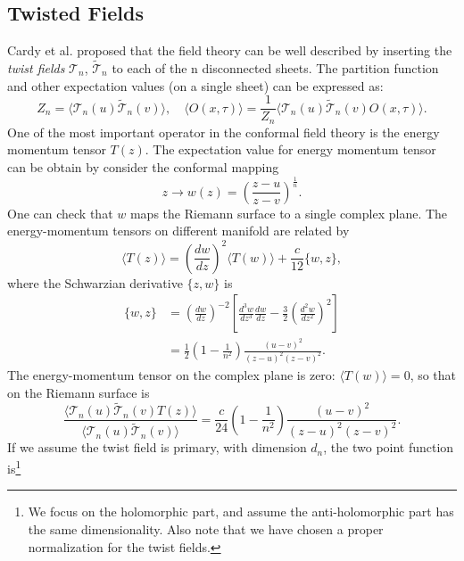 \documentclass[aps,prb,superscriptaddress,nofootinbib]{revtex4}
\begin{document}
\subsection{Twisted Fields}
Cardy et al. proposed that the field theory can be well described by inserting the \textit{twist fields} $\mathcal T_n$, $\tilde{\mathcal T}_n$ to each of the n disconnected sheets.
The partition function and other expectation values (on a single sheet) can be expressed as:
\begin{equation}
	Z_n = \langle \mathcal{T}_n(u) \tilde{\mathcal{T}}_n(v)\rangle, \quad
	\langle O(x,\tau)\rangle = \frac{1}{Z_n}\langle\mathcal{T}_n(u) \tilde{\mathcal{T}}_n(v) O(x,\tau) \rangle.
\end{equation}
One of the most important operator in the conformal field theory is the energy momentum tensor $T(z)$.
The expectation value for energy momentum tensor can be obtain by consider the conformal mapping
\begin{equation}
	z \rightarrow w(z) = \left(\frac{z-u}{z-v}\right)^{\frac{1}{n}}.
\end{equation} 
One can check that $w$ maps the Riemann surface to a single complex plane.
The energy-momentum tensors on different manifold are related by
\begin{equation}
	\langle T(z) \rangle = \left(\frac{d w}{d z}\right)^{2} \langle T(w)\rangle + \frac{c}{12}\{w, z\},
\end{equation}
where the Schwarzian derivative $\{z, w\}$ is
\begin{equation}
\begin{aligned}
	\{w,z\} &= \left(\frac{dw}{dz}\right)^{-2} \left[\frac{d^3 w}{dz^3}\frac{dw}{dz} - \frac{3}{2}\left(\frac{d^2 w}{dz^2}\right)^2\right] \\
	&= \frac{1}{2}\left(1-\frac{1}{n^2}\right)\frac{(u-v)^2}{(z-u)^2(z-v)^2}.
\end{aligned}
\end{equation}
The energy-momentum tensor on the complex plane is zero: $\langle T(w)\rangle=0$, so that on the Riemann surface is
\begin{equation}
	\frac{\langle\mathcal{T}_n(u) \tilde{\mathcal{T}}_n(v) T(z) \rangle}{\langle\mathcal{T}_n(u) \tilde{\mathcal{T}}_n(v) \rangle} 
	= \frac{c}{24}\left(1-\frac{1}{n^2}\right)\frac{(u-v)^2}{(z-u)^2(z-v)^2}.
\end{equation}
If we assume the twist field is primary, with dimension $d_n$, the two point function is\footnote{We focus on the holomorphic part, and assume the anti-holomorphic part has the same dimensionality. Also note that we have chosen a proper normalization for the twist fields.}
\end{document}
